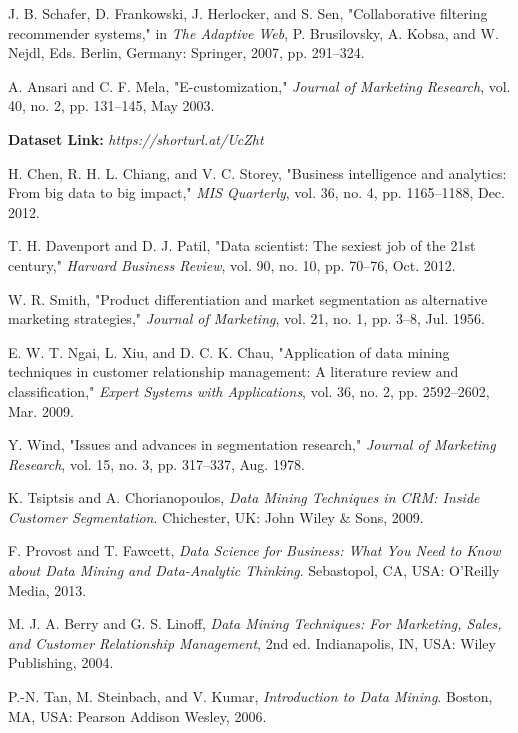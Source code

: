 \documentclass[12pt,a4paper]{report}
\begin{document}
\begin{enumerate}
J. B. Schafer, D. Frankowski, J. Herlocker, and S. Sen, "Collaborative filtering recommender systems," in \textit{The Adaptive Web}, P. Brusilovsky, A. Kobsa, and W. Nejdl, Eds. Berlin, Germany: Springer, 2007, pp. 291--324.

A. Ansari and C. F. Mela, "E-customization," \textit{Journal of Marketing Research}, vol. 40, no. 2, pp. 131--145, May 2003.

\textbf{Dataset Link:} \textit{https://shorturl.at/UcZht}

H. Chen, R. H. L. Chiang, and V. C. Storey, "Business intelligence and analytics: From big data to big impact," \textit{MIS Quarterly}, vol. 36, no. 4, pp. 1165--1188, Dec. 2012.

T. H. Davenport and D. J. Patil, "Data scientist: The sexiest job of the 21st century," \textit{Harvard Business Review}, vol. 90, no. 10, pp. 70--76, Oct. 2012.

W. R. Smith, "Product differentiation and market segmentation as alternative marketing strategies," \textit{Journal of Marketing}, vol. 21, no. 1, pp. 3--8, Jul. 1956.

E. W. T. Ngai, L. Xiu, and D. C. K. Chau, "Application of data mining techniques in customer relationship management: A literature review and classification," \textit{Expert Systems with Applications}, vol. 36, no. 2, pp. 2592--2602, Mar. 2009.

Y. Wind, "Issues and advances in segmentation research," \textit{Journal of Marketing Research}, vol. 15, no. 3, pp. 317--337, Aug. 1978.

K. Tsiptsis and A. Chorianopoulos, \textit{Data Mining Techniques in CRM: Inside Customer Segmentation}. Chichester, UK: John Wiley \& Sons, 2009.

F. Provost and T. Fawcett, \textit{Data Science for Business: What You Need to Know about Data Mining and Data-Analytic Thinking}. Sebastopol, CA, USA: O'Reilly Media, 2013.

M. J. A. Berry and G. S. Linoff, \textit{Data Mining Techniques: For Marketing, Sales, and Customer Relationship Management}, 2nd ed. Indianapolis, IN, USA: Wiley Publishing, 2004.

P.-N. Tan, M. Steinbach, and V. Kumar, \textit{Introduction to Data Mining}. Boston, MA, USA: Pearson Addison Wesley, 2006.








\end{enumerate}
\end{document}
